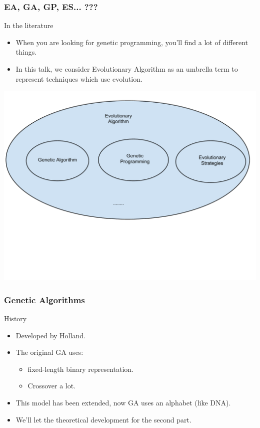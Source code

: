 \begin{frame}
  \frametitle{EA, GA, GP, ES... ???}
  \begin{block}{In the literature}
    \begin{itemize}
    \item When you are looking for genetic programming, you'll find a
      lot of different things.
    \item In this talk, we consider Evolutionary Algorithm as an
      umbrella term to represent techniques which use evolution.
    \end{itemize}
\end{block}

  \begin{center}
    \includegraphics[scale=0.4]{img/ea}
  \end{center}
\end{frame}

\begin{frame}
  \frametitle{Genetic Algorithms}
  \begin{block}{History}
    \begin{itemize}
    \item Developed by Holland\cite{holland1992}.
    \item The original GA uses:
      \begin{itemize}
        \item fixed-length binary representation.
        \item Crossover a lot.
      \end{itemize}
    \item This model has been extended, now GA uses an alphabet (like DNA).
    \item We'll let the theoretical development for the second part.
    \end{itemize}
  \end{block}
\end{frame}


